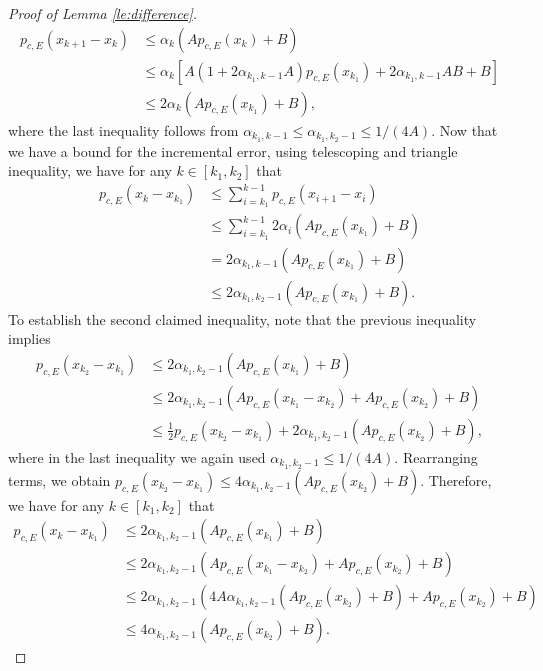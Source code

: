 \documentclass[11 pt]{article}
\begin{document}
\begin{proof}[Proof of Lemma \ref{le:difference}]
		\begin{align*}
			p_{c,E}(x_{k+1}-x_k)&\leq \alpha_k (A p_{c,E}(x_k)+B)\\
			&\leq \alpha_k \left[A \left(1+2\alpha_{k_1,k-1} A\right)p_{c,E}(x_{k_1})+2\alpha_{k_1,k-1} AB+B\right]\\
			&\leq 2\alpha_k (A p_{c,E}(x_{k_1})+B),
		\end{align*}
		where the last inequality follows from $\alpha_{k_1,k-1}\leq \alpha_{k_1,k_2-1}\leq 1/(4A)$. Now that we have a bound for the incremental error, using telescoping and triangle inequality, we have for any $k\in [k_1,k_2]$ that
		\begin{align*}
			p_{c,E}(x_k-x_{k_1})&\leq \sum_{i=k_1}^{k-1}p_{c,E}(x_{i+1}-x_i)\\
			&\leq \sum_{i=k_1}^{k-1}2\alpha_i (A p_{c,E}(x_{k_1})+B)\\
			&= 2\alpha_{k_1,k-1} (A p_{c,E}(x_{k_1})+B)\\
			&\leq 2\alpha_{k_1,k_2-1} (A p_{c,E}(x_{k_1})+B).
		\end{align*}
		To establish the second claimed inequality, note that the previous inequality implies
		\begin{align*}
			p_{c,E}(x_{k_2}-x_{k_1})&\leq 2\alpha_{k_1,k_2-1}(Ap_{c,E}(x_{k_1})+B)\\
			&\leq 2\alpha_{k_1,k_2-1}(Ap_{c,E}(x_{k_1}-x_{k_2})+Ap_{c,E}(x_{k_2})+B)\\
			&\leq \frac{1}{2}p_{c,E}(x_{k_2}-x_{k_1})+ 2\alpha_{k_1,k_2-1}(Ap_{c,E}(x_{k_2})+B),
		\end{align*}
		where in the last inequality we again used $\alpha_{k_1,k_2-1}\leq 1/(4A)$.
		Rearranging terms, we obtain $p_{c,E}(x_{k_2}-x_{k_1})\leq   4\alpha_{k_1,k_2-1}(Ap_{c,E}(x_{k_2})+B)$. Therefore, we have for any $k\in [k_1,k_2]$ that
		\begin{align*}
			p_{c,E}(x_k-x_{k_1})&\leq 2\alpha_{k_1,k_2-1}(Ap_{c,E}(x_{k_1})+B)\\
			&\leq 2\alpha_{k_1,k_2-1}(Ap_{c,E}(x_{k_1}-x_{k_2})+Ap_{c,E}(x_{k_2})+B)\\
			&\leq 2\alpha_{k_1,k_2-1}(4A\alpha_{k_1,k_2-1}(Ap_{c,E}(x_{k_2})+B)+Ap_{c,E}(x_{k_2})+B)\\\
			&\leq 4\alpha_{k_1,k_2-1}(Ap_{c,E}(x_{k_2})+B). 
		\end{align*}
	\end{proof}
	
\end{document}
